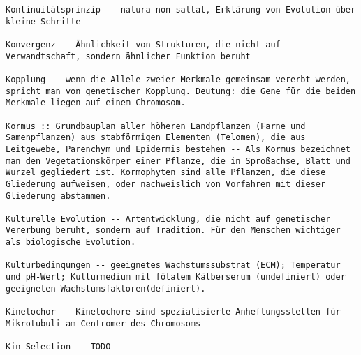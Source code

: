 \documentclass{article}
\begin{document}
\begin{verbatim}
Kontinuitätsprinzip -- natura non saltat, Erklärung von Evolution über kleine Schritte

Konvergenz -- Ähnlichkeit von Strukturen, die nicht auf Verwandtschaft, sondern ähnlicher Funktion beruht

Kopplung -- wenn die Allele zweier Merkmale gemeinsam vererbt werden, spricht man von genetischer Kopplung. Deutung: die Gene für die beiden Merkmale liegen auf einem Chromosom.

Kormus :: Grundbauplan aller höheren Landpflanzen (Farne und Samenpflanzen) aus stabförmigen Elementen (Telomen), die aus Leitgewebe, Parenchym und Epidermis bestehen -- Als Kormus bezeichnet man den Vegetationskörper einer Pflanze, die in Sproßachse, Blatt und Wurzel gegliedert ist. Kormophyten sind alle Pflanzen, die diese Gliederung aufweisen, oder nachweislich von Vorfahren mit dieser Gliederung abstammen.

Kulturelle Evolution -- Artentwicklung, die nicht auf genetischer Vererbung beruht, sondern auf Tradition. Für den Menschen wichtiger als biologische Evolution.

Kulturbedinqungen -- geeignetes Wachstumssubstrat (ECM); Temperatur und pH-Wert; Kulturmedium mit fötalem Kälberserum (undefiniert) oder geeigneten Wachstumsfaktoren(definiert).

Kinetochor -- Kinetochore sind spezialisierte Anheftungsstellen für Mikrotubuli am Centromer des Chromosoms

Kin Selection -- TODO

\end{verbatim}
\newpage
\end{document}
